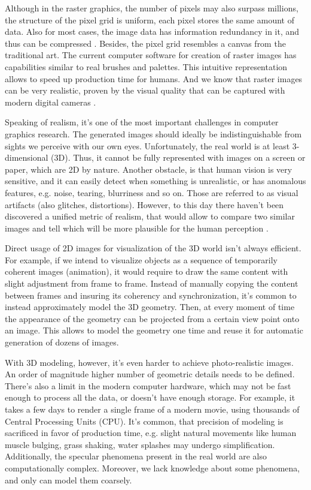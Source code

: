 Although in the raster graphics, the number of pixels may also surpass millions, the structure of the pixel grid is uniform, each pixel stores the same amount of data. Also for most cases, the image data has information redundancy in it, and thus can be compressed \cite{aux:compression18}. Besides, the pixel grid resembles a canvas from the traditional art. The current computer software for creation of raster images has capabilities similar to real brushes and palettes. This intuitive representation allows to speed up production time for humans. And we know that raster images can be very realistic, proven by the visual quality that can be captured with modern digital cameras \cite{aux:camera21}.

Speaking of realism, it's one of the most important challenges in computer graphics research. The generated images should ideally be indistinguishable from sights we perceive with our own eyes. Unfortunately, the real world is at least 3-dimensional (3D). Thus, it cannot be fully represented with images on a screen or paper, which are 2D by nature. Another obstacle, is that human vision is very sensitive, and it can easily detect when something is unrealistic, or has anomalous features, e.g. noise, tearing, blurriness and so on. Those are referred to as visual artifacts (also glitches, distortions). However, to this day there haven't been discovered a unified metric of realism, that would allow to compare two similar images and tell which will be more plausible for the human perception \cite{metric:wang11}.

Direct usage of 2D images for visualization of the 3D world isn't always efficient. For example, if we intend to visualize objects as a sequence of temporarily coherent images (animation), it would require to draw the same content with slight adjustment from frame to frame. Instead of manually copying the content between frames and insuring its coherency and synchronization, it's common to instead approximately model the 3D geometry. Then, at every moment of time the appearance of the geometry can be projected from a certain view point onto an image. This allows to model the geometry one time and reuse it for automatic generation of dozens of images.


With 3D modeling, however, it's even harder to achieve photo-realistic images. An order of magnitude higher number of geometric details needs to be defined. There's also a limit in the modern computer hardware, which may not be fast enough to process all the data, or doesn't have enough storage. For example, it takes a few days to render a single frame of a modern movie, using thousands of Central Processing Units (CPU). It's common, that precision of modeling is sacrificed in favor of production time, e.g. slight natural movements like human muscle bulging, grass shaking, water splashes may undergo simplification. Additionally, the specular phenomena present in the real world \cite{TODO} are also computationally complex. Moreover, we lack knowledge about some phenomena, and only can model them coarsely.

